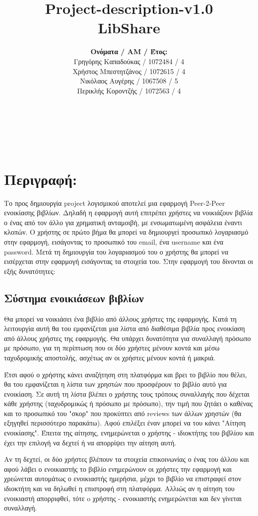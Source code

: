 \documentclass[12pt,a4paper]{article}
\title{Project-description-v1.0 \\ LibShare}
\author{\textbf{Ονόματα / ΑΜ / Έτος:} \\ Γρηγόρης Καπαδούκας / 1072484 / 4\textdegree \\ Χρήστος Μπεστητζάνος / 1072615 / 4\textdegree \\ Νικόλαος Αυγέρης / 1067508 / 5\textdegree \\ Περικλής Κοροντζής / 1072563 / 4\textdegree}
\begin{document}
\makeatletter
\begin{center}
	\LARGE{\@title} \\
	\pagebreak
	\begin{LARGE}\@author\end{LARGE} \\
\end{center}
\pagebreak

\section{Περιγραφή:}
\label{Περιγραφή}
Το προς δημιουργία project λογισμικού αποτελεί μια εφαρμογή Peer-2-Peer ενοικίασης βιβλίων. Δηλαδή η εφαρμογή αυτή επιτρέπει χρήστες να νοικιάζουν βιβλία ο ένας από τον άλλο για χρηματική ανταμοιβή, με ενσωματωμένη ασφάλεια έναντι κλοπών. Ο χρήστης σε πρώτο βήμα θα μπορεί να δημιουργεί προσωπικό λογαριασμό στην εφαρμογή, εισάγοντας το προσωπικό του email, ένα username και ένα password. Μετά τη δημιουργία του λογαριασμού του ο χρήστης θα μπορεί να εισέρχεται στην εφαρμογή εισάγοντας τα στοιχεία του. Στην εφαρμογή του δίνονται οι εξής δυνατότητες:

\subsection{Σύστημα ενοικιάσεων βιβλίων}
Θα μπορεί να νοικιάσει ένα βιβλίο από άλλους χρήστες της εφαρμογής. Κατά τη λειτουργία αυτή θα του εμφανίζεται μια λίστα από διαθέσιμα βιβλία προς ενοικίαση από άλλους χρήστες της εφαρμογής. Θα υπάρχει δυνατότητα για συναλλαγή πρόσωπο με πρόσωπο, για τη περίπτωση που οι δύο χρήστες μένουν κοντά και μέσω ταχυδρομικής αποστολής, ασχέτως αν οι χρήστες μένουν κοντά ή μακριά.

Έτσι αφού ο χρήστης κάνει αναζήτηση στη πλατφόρμα και βρει το βιβλίο που θέλει, θα του εμφανίζεται η λίστα των χρηστών που προσφέρουν το βιβλίο αυτό για ενοικίαση. Σε αυτή τη λίστα βλέπει ο χρήστης τους τρόπους συναλλαγής που δέχεται κάθε χρήστης (ταχυδρομικώς ή πρόσωπο με πρόσωπο), την τιμή που ζητάει ο καθένας και το προσωπικό του "σκορ" που προκύπτει από reviews των άλλων χρηστών (θα εξηγηθεί περισσότερο παρακάτω). Αφού επιλέξει έναν μπορεί να του κάνει "Αίτηση ενοικίασης". Έπειτα της αίτησης, ενημερώνεται ο χρήστης - ιδιοκτήτης του βιβλίου και έχει την επιλογή να δεχτεί ή να απορρίψει την αίτηση αυτή.

Αν τη δεχτεί, οι δύο χρήστες βλέπουν τα στοιχεία επικοινωνίας ο ένας του άλλου και αφού λάβει ο ενοικιαστής το βιβλίο ενημερώνουν οι χρήστες την εφαρμογή και χρεώνεται αυτομάτως ο ενοικιαστής ημερήσια, μέχρι το βιβλίο να επιστραφεί στον ιδιοκτήτη και να δηλωθεί η επιστροφή στη πλατφόρμα. 
Αλλιώς αν η αίτηση του ενοικιαστή απορριφθεί, τότε o χρήστης - ενοικιαστής ενημερώνεται και δεν γίνεται συναλλαγή.
\end{document}
